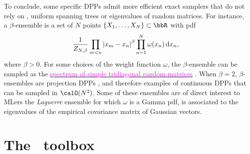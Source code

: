\documentclass[twoside,11pt]{article}
\begin{document}
        To conclude, some specific DPPs admit more efficient exact samplers that do not rely on , \eg uniform spanning trees \citep{PrWi98} or eigenvalues of random matrices.
        For instance, a $\beta$-ensemble is a set of $N$ points $\{X_1,\dots,X_N\}\subset \bbR$ with pdf
        \begin{equation*}
        \label{eq:beta_ensemble_pdf}
        \frac{1}{Z_{N,\beta}}
        \prod_{m< n}
            \left| x_m-x_n \right|^{\beta}
        \prod_{n= 1}^N
            \omega(x_n)
            \mathop{}\!\mathrm{d} x_n,
        \end{equation*}
        where $\beta>0$.
        For some choices of the weight function $\omega$, the $\beta$-ensemble can be sampled as the \href{https://dppy.readthedocs.io/en/latest/continuous_dpps/beta_ensembles.banded_models.html}{\textcolor{magenta}{spectrum of simple tridiagonal random matrices}} \citep{DuEd02,KiNe04}.
        When $\beta=2$, $\beta$-ensembles are projection DPPs \citep{Kon05}, and therefore examples of continuous DPPs that can be sampled in $\calO(N^2)$.
        Some of these ensembles are of direct interest to MLers \eg the \emph{Laguerre} ensemble for which $\omega$ is a Gamma pdf, is associated to the eigenvalues of the empirical covariance matrix of \iid Gaussian vectors.



\section{The \DPPy\ toolbox} %
\label{sec:the_dppy_toolbox}

    \lstset{language=mypython}
\end{document}
